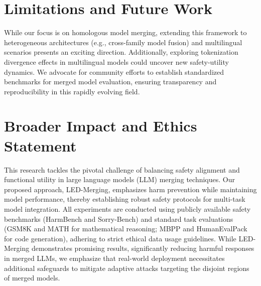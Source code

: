 

\section{Limitations and Future Work}
While our focus is on homologous model merging, extending this framework to heterogeneous architectures (e.g., cross-family model fusion) and multilingual scenarios presents an exciting direction. Additionally, exploring tokenization divergence effects in multilingual models could uncover new safety-utility dynamics. We advocate for community efforts to establish standardized benchmarks for merged model evaluation, ensuring transparency and reproducibility in this rapidly evolving field.

\section{Broader Impact and Ethics Statement}
This research tackles the pivotal challenge of balancing safety alignment and functional utility in large language models (LLM) merging techniques. Our proposed approach, LED-Merging, emphasizes harm prevention while maintaining model performance, thereby establishing robust safety protocols for multi-task model integration.
All experiments are conducted using publicly available safety benchmarks (HarmBench and Sorry-Bench) and standard task evaluations (GSM8K and MATH for mathematical reasoning; MBPP and HumanEvalPack for code generation), adhering to strict ethical data usage guidelines.
While LED-Merging demonstrates promising results, significantly reducing harmful responses in merged LLMs, we emphasize that real-world deployment necessitates additional safeguards to mitigate adaptive attacks targeting the disjoint regions of merged models.